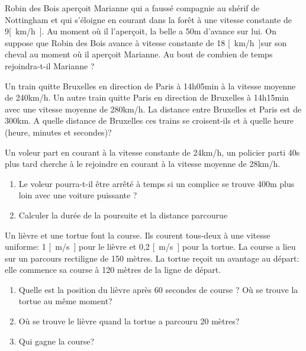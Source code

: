 \begin{exercise}
    Robin des Bois aperçoit Marianne qui a faussé compagnie au shérif de Nottingham et qui s'éloigne en courant dans la forêt à une vitesse constante de 9\unit{[km/h]}. Au moment où il l'aperçoit, la belle a 50m d'avance sur lui. On suppose que Robin des Bois avance à vitesse constante de 18 \unit{[km/h]}sur son cheval au moment où il aperçoit Marianne. Au bout de combien de temps rejoindra-t-il Marianne ?
\end{exercise}

\begin{exercise}
    Un train quitte Bruxelles en direction de Paris à 14h05min à la vitesse moyenne de 240km/h. Un autre train quitte Paris en direction de Bruxelles à 14h15min avec une vitesse moyenne de 280km/h. La distance entre Bruxelles et Paris est de 300km. A quelle distance de Bruxelles ces trains se croisent-ils et à quelle heure (heure, minutes et secondes)?
\end{exercise}

\begin{exercise}
    Un voleur part en courant à la vitesse constante de 24km/h, un policier parti 40s plus tard cherche à le rejoindre en courant à la vitesse moyenne de 28km/h.
    \begin{enumerate}[label=\alph*)]
        \item Le voleur pourra-t-il être arrêté à temps si un complice se trouve 400m plus loin avec une voiture puissante ?
        \item Calculer la durée de la poursuite et la distance parcourue
    \end{enumerate}
\end{exercise}

\begin{exercise}
    Un lièvre et une tortue font la course. Ils courent tous-deux à une vitesse uniforme: 1 \unit{[m/s]} pour le lièvre et 0,2 \unit{[m/s]} pour la tortue. La course a lieu sur un parcours rectiligne de 150 mètres. La tortue reçoit un avantage au départ: elle commence sa course à 120 mètres de la ligne de départ.
    \begin{enumerate}[label=\alph*)]
        \item Quelle est la position du lièvre après 60 secondes de course ? Où se trouve la tortue au même moment?
        \item Où se trouve le lièvre quand la tortue a parcouru 20 mètres?
        \item Qui gagne la course?
    \end{enumerate}
\end{exercise}
